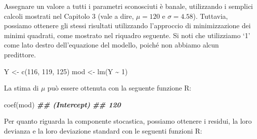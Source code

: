 \documentclass[
  12pt,
]{book}
\newenvironment{Shaded}{\begin{snugshade}}{\end{snugshade}}
\newcommand{\CommentTok}[1]{\textcolor[rgb]{0.56,0.35,0.01}{\textit{#1}}}
\newcommand{\DecValTok}[1]{\textcolor[rgb]{0.00,0.00,0.81}{#1}}
\newcommand{\DocumentationTok}[1]{\textcolor[rgb]{0.56,0.35,0.01}{\textbf{\textit{#1}}}}
\newcommand{\FunctionTok}[1]{\textcolor[rgb]{0.00,0.00,0.00}{#1}}
\newcommand{\NormalTok}[1]{#1}
\newcommand{\OtherTok}[1]{\textcolor[rgb]{0.56,0.35,0.01}{#1}}
\newcommand{\SpecialCharTok}[1]{\textcolor[rgb]{0.00,0.00,0.00}{#1}}
\begin{document}
Assegnare un valore a tutti i parametri sconosciuti è banale, utilizzando i semplici calcoli mostrati nel Capitolo 3 (vale a dire, \(\mu = 120\) e \(\sigma = 4.58\)). Tuttavia, possiamo ottenere gli stessi risultati utilizzando l'approccio di minimizzazione dei minimi quadrati, come mostrato nel riquadro seguente. Si noti che utilizziamo `1' come lato destro dell'equazione del modello, poiché non abbiamo alcun predittore.

\vspace{12pt}

\begin{Shaded}
\begin{Highlighting}[]
\NormalTok{Y }\OtherTok{\textless{}{-}} \FunctionTok{c}\NormalTok{(}\DecValTok{116}\NormalTok{, }\DecValTok{119}\NormalTok{, }\DecValTok{125}\NormalTok{)}
\NormalTok{mod }\OtherTok{\textless{}{-}} \FunctionTok{lm}\NormalTok{(Y }\SpecialCharTok{\textasciitilde{}} \DecValTok{1}\NormalTok{)}
\end{Highlighting}
\end{Shaded}

La stima di \(\mu\) può essere ottenuta con la seguente funzione R:

\vspace{12pt}

\begin{Shaded}
\begin{Highlighting}[]
\FunctionTok{coef}\NormalTok{(mod)}
\DocumentationTok{\#\# (Intercept) }
\DocumentationTok{\#\#         120}
\end{Highlighting}
\end{Shaded}

Per quanto riguarda la componente stocastica, possiamo ottenere i residui, la loro devianza e la loro deviazione standard con le seguenti funzioni R:

\vspace{12pt}

\begin{Shaded}
\end{Shaded}
\end{document}
